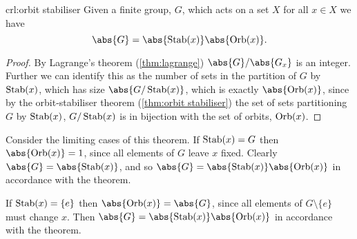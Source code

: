 \begin{crl}{}{crl:orbit stabiliser}
    Given a finite group, \(G\), which acts on a set \(X\) for all \(x \in X\) we have
    \begin{equation}
        \abs{G} = \abs{\Stab(x)} \abs{\Orb(x)}.
    \end{equation}
    \begin{proof}
        By Lagrange's theorem (\cref{thm:lagrange}) \(\abs{G}/\abs{G_x}\) is an integer.
        Further we can identify this as the number of sets in the partition of \(G\) by \(\operatorname{Stab}(x)\), which has size \(\abs{G/\Stab(x)}\), which is exactly \(\abs{\Orb(x)}\), since by the orbit-stabiliser theorem (\cref{thm:orbit stabiliser}) the set of sets partitioning \(G\) by \(\operatorname{Stab}(x)\), \(G/\operatorname{Stab}(x)\) is in bijection with the set of orbits, \(\operatorname{Orb}(x)\).
    \end{proof}
\end{crl}

Consider the limiting cases of this theorem.
If \(\operatorname{Stab}(x) = G\) then \(\abs{\Orb(x)} = 1\), since all elements of \(G\) leave \(x\) fixed.
Clearly \(\abs{G} = \abs{\Stab(x)}\), and so \(\abs{G} = \abs{\Stab(x)}\abs{\Orb(x)}\) in accordance with the theorem.

If \(\operatorname{Stab}(x) = \{e\}\) then \(\abs{\Orb(x)} = \abs{G}\), since all elements of \(G\setminus\{e\}\) must change \(x\).
Then \(\abs{G} = \abs{\Stab(x)}\abs{\Orb(x)}\) in accordance with the theorem.

